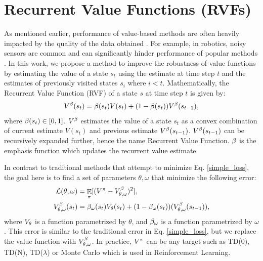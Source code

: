 \section{Recurrent Value Functions (RVFs)}
\label{RLRL}
As mentioned earlier, performance of value-based methods are often heavily impacted by the quality of the data obtained \cite{fox2015taming,pendrith1994reinforcement}. For example, in robotics, noisy sensors are common and can significantly hinder performance of popular methods \cite{romoff2018reward}. In this work, we propose a method to improve the robustness of value functions by estimating the value of a state $s_t$ using the estimate at time step $t$ and the estimates of previously visited states $s_i$ where $i < t$.
Mathematically, the Recurrent Value Function (RVF) of a state $s$ at time step $t$ is given by:
\begin{equation}
\label{value}
\begin{split}
    V^{\beta}(s_t) &= \beta(s_t) V(s_t) + (1 - \beta(s_t)) V^{\beta}(s_{t-1}), \\ 
\end{split}
\end{equation}
where  $\beta(s_t) \in [0,1]$. $V^{\beta}$ estimates the value of a state $s_t$ as a convex combination of current estimate $V(s_t)$ and previous estimate $V^{\beta}(s_{t-1})$. $V^{\beta}(s_{t-1})$ can be recursively expanded further, hence the name Recurrent Value Function. $\beta$ is the emphasis function which updates the recurrent value estimate. 

In contrast to traditional methods that attempt to minimize Eq. \ref{simple_loss}, the goal here is to find a set of parameters $\theta,\omega$ that minimize the following error:
\begin{equation}
\begin{split}
    \mathcal{L}(\theta,\omega) &= \mathop{\mathbb{E}}_{\pi} [(V^{\pi} - V^{\beta}_{\theta, \omega})^2], \\
	 V^{\beta}_{\theta, \omega}(s_t) &= \beta_{\omega}(s_t) V_{\theta}(s_t) + (1 - \beta_{\omega}(s_t)) (V^{\beta}_{\theta, \omega}(s_{t-1})),
\end{split}
\label{loss_beta}
\end{equation}
where $V_{\theta}$ is a function parametrized by $\theta$, and $\beta_{\omega}$ is a function parametrized by $\omega$.
This error is similar to the traditional error in Eq. \ref{simple_loss}, but we replace the value function with $V^{\beta}_{\theta, \omega}$. In practice, $V^{\pi}$ can be any target such as TD(0), TD(N), TD($\lambda$) or Monte Carlo \cite{sutton1998reinforcement} which is used in Reinforcement Learning.

